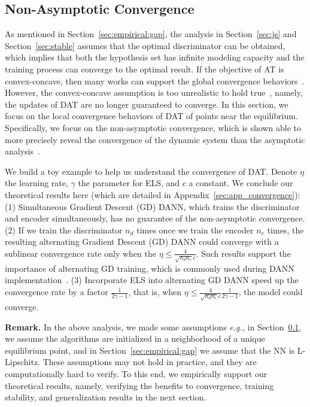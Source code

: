 \documentclass{article} \usepackage{iclr2023_conference,times}
\newcommand{\ls}[0]{ELS\xspace}
\newcommand{\eg}[0]{\textit{e.g., }}
\begin{document}
\vspace{-0.15cm}
\subsection{Non-Asymptotic Convergence}\label{sec:convergence}
\vspace{-0.15cm}
As mentioned in Section~\ref{sec:empirical:gap}, the analysis in Section~\ref{sec:js} and Section~\ref{sec:stable} assumes that the optimal discriminator can be obtained, which implies that both the hypothesis set has infinite modeling capacity and the training process can converge to the optimal result. If the objective of AT is convex-concave, then many works can support the global convergence behaviors~\citep{nowozin2016f,yadav2017stabilizing}. However, the convex-concave assumption is too unrealistic to hold true~\citep{nie2020towards,nagarajan2017gradient}, namely, the updates of DAT are no longer guaranteed to converge. In this section, we focus on the local convergence behaviors of DAT of points near the equilibrium. Specifically, we focus on the non-asymptotic convergence, which is shown able to more precisely reveal the convergence of the dynamic system than the asymptotic analysis~\citep{nie2020towards}. 


We build a toy example to help us understand the convergence of DAT. Denote $\eta$ the learning rate, $\gamma$ the parameter for \ls, and $c$ a constant. We conclude our theoretical results here (which are detailed in Appendix~\ref{sec:app_convergence}): (1) Simultaneous Gradient Descent (GD) DANN, which trains the discriminator and encoder simultaneously, has no guarantee of the non-asymptotic convergence. (2) If we train the discriminator $n_d$ times once we train the encoder $n_e$ times, the resulting alternating Gradient Descent (GD) DANN could converge with a sublinear convergence rate only when the $\eta\leq\frac{4}{\sqrt{n_dn_e}c}$. Such results support the importance of alternating GD training, which is commonly used during DANN implementation~\citep{gulrajani2021in}. (3) Incorporate \ls into alternating GD DANN speed up the convergence rate by a factor $\frac{1}{2\gamma-1}$, that is, when $\eta\leq\frac{4}{\sqrt{n_dn_e}c}\frac{1}{2\gamma-1}$, the model could converge.



\textbf{Remark.} In the above analysis, we made some assumptions \eg in Section~\ref{sec:convergence}, we assume the algorithms are initialized in a neighborhood of a unique equilibrium point, and in Section~\ref{sec:empirical:gap} we assume that the NN is L-Lipschitz. These assumptions may not hold in practice, and they are computationally hard to verify. To this end, we empirically support our theoretical results, namely, verifying the benefits to convergence, training stability, and generalization results in the next section.
\end{document}
